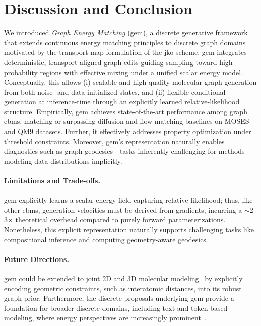 \section{Discussion and Conclusion}
We introduced \emph{Graph Energy Matching} (\gls{gem}), a discrete generative framework that extends continuous energy matching principles to discrete graph domains motivated by the transport-map formulation of the \gls{jko} scheme. \gls{gem} integrates deterministic, transport-aligned graph edits guiding sampling toward high-probability regions with effective mixing under a unified scalar energy model. Conceptually, this allows (i) scalable and high-quality molecular graph generation from both noise- and data-initialized states, and (ii) flexible conditional generation at inference-time through an explicitly learned relative-likelihood structure. Empirically, \gls{gem} achieves state-of-the-art performance among graph \glspl{ebm}, matching or surpassing diffusion and flow matching baselines on MOSES and QM9 datasets. Further, it effectively addresses property optimization under threshold constraints. Moreover, \gls{gem}'s representation naturally enables diagnostics such as graph geodesics—tasks inherently challenging for methods modeling data distributions implicitly.

\paragraph{Limitations and Trade-offs.}  \gls{gem} explicitly learns a scalar energy field capturing relative likelihood; thus, like other \glspl{ebm}, generation velocities must be derived from gradients, incurring a $\sim$2--3$\times$ theoretical overhead compared to purely forward parameterizations. Nonetheless, this explicit representation naturally supports challenging tasks like compositional inference and computing geometry-aware geodesics.


\paragraph{Future Directions.}
\gls{gem} could be extended to joint 2D and 3D molecular modeling~\citep{liu2022pre,chen2023molecule} by explicitly encoding geometric constraints, such as interatomic distances, into its robust graph prior. Furthermore, the discrete proposals underlying \gls{gem} provide a foundation for broader discrete domains, including text and token-based modeling, where energy perspectives are increasingly prominent~\citep{blondel2025autoregressive,xu2025energy}.



